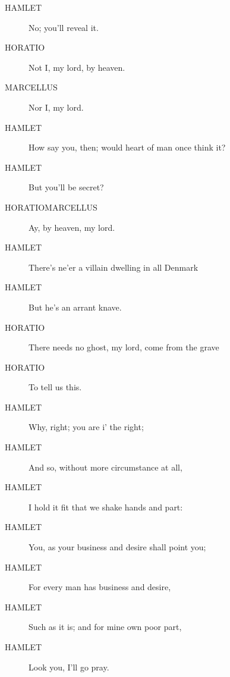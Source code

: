 \documentclass{article}
\begin{document}
\begin{description}
            
\item[HAMLET] No; you'll reveal it.
\end{description}
          
\begin{description}
            
\item[HORATIO] Not I, my lord, by heaven.
\end{description}
          
\begin{description}
            
\item[MARCELLUS] Nor I, my lord.
\end{description}
          
\begin{description}
            
\item[HAMLET] How say you, then; would heart of man once think it?
\item[HAMLET] But you'll be secret?
\end{description}
          
\begin{description}
            
\item[HORATIOMARCELLUS] Ay, by heaven, my lord.
\end{description}
          
\begin{description}
            
\item[HAMLET] There's ne'er a villain dwelling in all Denmark
\item[HAMLET] But he's an arrant knave.
\end{description}
          
\begin{description}
            
\item[HORATIO] There needs no ghost, my lord, come from the grave
\item[HORATIO] To tell us this.
\end{description}
          
\begin{description}
            
\item[HAMLET] Why, right; you are i' the right;
\item[HAMLET] And so, without more circumstance at all,
\item[HAMLET] I hold it fit that we shake hands and part:
\item[HAMLET] You, as your business and desire shall point you;
\item[HAMLET] For every man has business and desire,
\item[HAMLET] Such as it is; and for mine own poor part,
\item[HAMLET] Look you, I'll go pray.
\end{description}
          
\end{document}
